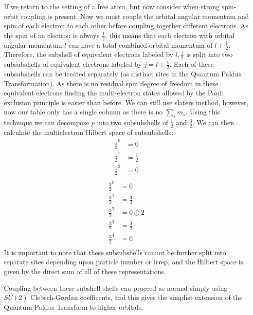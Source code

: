 \documentclass{article}
\begin{document}
If we return to the setting of a free atom, but now consider when strong spin-orbit coupling is present. Now we must couple the orbital angular momentum and spin of each electron to each other before coupling together different electrons. As the spin of an electron is always $\frac{1}{2}$, this means that each electron with orbital angular momentum $l$ can have a total combined orbital momentum of $l\pm \frac{1}{2}$. Therefore, the subshell of equivalent electrons labeled by $l,\frac{1}{2}$ is split into two subsubshells of equivalent electrons labeled by $j = l\pm \frac{1}{2}$. Each of these subsubshells can be treated separately (as distinct sites in the Quantum Paldus Transformation). As there is no residual spin degree of freedom in these equivalent electrons finding the multi-electron states allowed by the Pauli exclusion principle is easier than before. We can still use slaters method, however, now our table only has a single column as there is no $\sum_s m_s$. Using this technique we can decompose $p$ into two subsubshells of $\frac{1}{2}$ and $\frac{3}{2}$. We can then calculate the multielectron Hilbert space of subsubshells:
\begin{align}
    \frac{1}{2}^0 &= 0\\
    \frac{1}{2}^1 &= \frac{1}{2}\\
    \frac{1}{2}^2 &= 0\\
\end{align}
\begin{align}
    \frac{3}{2}^0 &= 0\\
    \frac{3}{2}^1 &= \frac{3}{2}\\
    \frac{3}{2}^2 &= 0 \oplus 2\\
    \frac{3}{2}^3 &= \frac{3}{2}\\
    \frac{3}{2}^4 &= 0\\
\end{align}
It is important to note that these subsubshells cannot be further split into separate sites depending upon particle number or irrep, and the Hilbert space is given by the direct sum of all of these representations.

Coupling between these subshell shells can proceed as normal simply using $SU(2)$ Clebsch-Gordan coefficents, and this gives the simplist extension of the Quantum Paldus Transform to higher orbitals.

\end{document}
